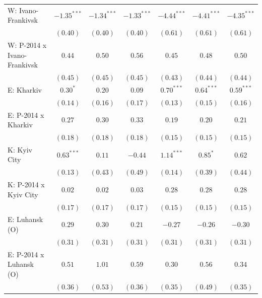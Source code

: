 \begin{table}
\begin{center}
\begin{small}
\begin{tabular}{l c c c c c c}
W: Ivano-Frankivsk          & $-1.35^{***}$ & $-1.34^{***}$ & $-1.33^{***}$  & $-4.44^{***}$ & $-4.41^{***}$ & $-4.35^{***}$ \\
                            & $(0.40)$      & $(0.40)$      & $(0.40)$       & $(0.61)$      & $(0.61)$      & $(0.61)$      \\
W: P-2014 x Ivano-Frankivsk & $0.44$        & $0.50$        & $0.56$         & $0.45$        & $0.48$        & $0.50$        \\
                            & $(0.45)$      & $(0.45)$      & $(0.45)$       & $(0.43)$      & $(0.44)$      & $(0.44)$      \\
E: Kharkiv                  & $0.30^{*}$    & $0.20$        & $0.09$         & $0.70^{***}$  & $0.64^{***}$  & $0.59^{***}$  \\
                            & $(0.14)$      & $(0.16)$      & $(0.17)$       & $(0.13)$      & $(0.15)$      & $(0.16)$      \\
E: P-2014 x Kharkiv         & $0.27$        & $0.30$        & $0.33$         & $0.19$        & $0.20$        & $0.21$        \\
                            & $(0.18)$      & $(0.18)$      & $(0.18)$       & $(0.15)$      & $(0.15)$      & $(0.15)$      \\
K: Kyiv City                & $0.63^{***}$  & $0.11$        & $-0.44$        & $1.14^{***}$  & $0.85^{*}$    & $0.62$        \\
                            & $(0.13)$      & $(0.43)$      & $(0.49)$       & $(0.14)$      & $(0.39)$      & $(0.44)$      \\
K: P-2014 x Kyiv City       & $0.02$        & $0.02$        & $0.03$         & $0.28$        & $0.28$        & $0.28$        \\
                            & $(0.17)$      & $(0.17)$      & $(0.17)$       & $(0.15)$      & $(0.15)$      & $(0.15)$      \\
E: Luhansk (O)              & $0.29$        & $0.30$        & $0.21$         & $-0.27$       & $-0.26$       & $-0.30$       \\
                            & $(0.31)$      & $(0.31)$      & $(0.31)$       & $(0.31)$      & $(0.31)$      & $(0.31)$      \\
E: P-2014 x Luhansk (O)     & $0.51$        & $1.01$        & $0.59$         & $0.30$        & $0.56$        & $0.34$        \\
                            & $(0.36)$      & $(0.53)$      & $(0.36)$       & $(0.35)$      & $(0.49)$      & $(0.35)$      \\

\end{tabular}
\end{small}
\end{center}
\end{table}
